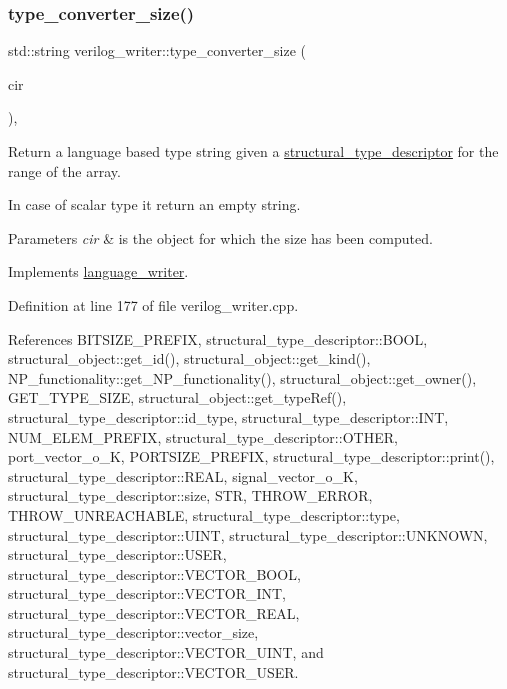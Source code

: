 \subsubsection{\texorpdfstring{type\+\_\+converter\+\_\+size()}{type\_converter\_size()}}
{\footnotesize\ttfamily std\+::string verilog\+\_\+writer\+::type\+\_\+converter\+\_\+size (\begin{DoxyParamCaption}\item[{const \hyperlink{structural__objects_8hpp_a8ea5f8cc50ab8f4c31e2751074ff60b2}{structural\+\_\+object\+Ref} \&}]{cir }\end{DoxyParamCaption})\hspace{0.3cm}{\ttfamily [override]}, {\ttfamily [virtual]}}



Return a language based type string given a \hyperlink{structstructural__type__descriptor}{structural\+\_\+type\+\_\+descriptor} for the range of the array. 

In case of scalar type it return an empty string. 
\begin{DoxyParams}{Parameters}
{\em cir} & is the object for which the size has been computed. \\
\hline
\end{DoxyParams}


Implements \hyperlink{classlanguage__writer_a154f45ed77a5dff96d190b4e1ccfa366}{language\+\_\+writer}.



Definition at line 177 of file verilog\+\_\+writer.\+cpp.



References B\+I\+T\+S\+I\+Z\+E\+\_\+\+P\+R\+E\+F\+IX, structural\+\_\+type\+\_\+descriptor\+::\+B\+O\+OL, structural\+\_\+object\+::get\+\_\+id(), structural\+\_\+object\+::get\+\_\+kind(), N\+P\+\_\+functionality\+::get\+\_\+\+N\+P\+\_\+functionality(), structural\+\_\+object\+::get\+\_\+owner(), G\+E\+T\+\_\+\+T\+Y\+P\+E\+\_\+\+S\+I\+ZE, structural\+\_\+object\+::get\+\_\+type\+Ref(), structural\+\_\+type\+\_\+descriptor\+::id\+\_\+type, structural\+\_\+type\+\_\+descriptor\+::\+I\+NT, N\+U\+M\+\_\+\+E\+L\+E\+M\+\_\+\+P\+R\+E\+F\+IX, structural\+\_\+type\+\_\+descriptor\+::\+O\+T\+H\+ER, port\+\_\+vector\+\_\+o\+\_\+K, P\+O\+R\+T\+S\+I\+Z\+E\+\_\+\+P\+R\+E\+F\+IX, structural\+\_\+type\+\_\+descriptor\+::print(), structural\+\_\+type\+\_\+descriptor\+::\+R\+E\+AL, signal\+\_\+vector\+\_\+o\+\_\+K, structural\+\_\+type\+\_\+descriptor\+::size, S\+TR, T\+H\+R\+O\+W\+\_\+\+E\+R\+R\+OR, T\+H\+R\+O\+W\+\_\+\+U\+N\+R\+E\+A\+C\+H\+A\+B\+LE, structural\+\_\+type\+\_\+descriptor\+::type, structural\+\_\+type\+\_\+descriptor\+::\+U\+I\+NT, structural\+\_\+type\+\_\+descriptor\+::\+U\+N\+K\+N\+O\+WN, structural\+\_\+type\+\_\+descriptor\+::\+U\+S\+ER, structural\+\_\+type\+\_\+descriptor\+::\+V\+E\+C\+T\+O\+R\+\_\+\+B\+O\+OL, structural\+\_\+type\+\_\+descriptor\+::\+V\+E\+C\+T\+O\+R\+\_\+\+I\+NT, structural\+\_\+type\+\_\+descriptor\+::\+V\+E\+C\+T\+O\+R\+\_\+\+R\+E\+AL, structural\+\_\+type\+\_\+descriptor\+::vector\+\_\+size, structural\+\_\+type\+\_\+descriptor\+::\+V\+E\+C\+T\+O\+R\+\_\+\+U\+I\+NT, and structural\+\_\+type\+\_\+descriptor\+::\+V\+E\+C\+T\+O\+R\+\_\+\+U\+S\+ER.



